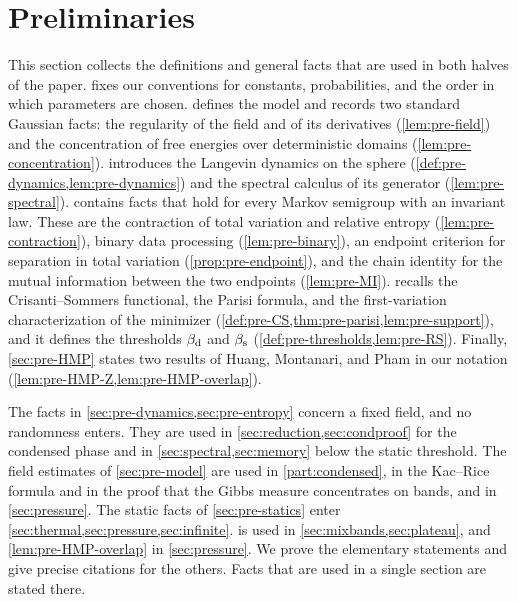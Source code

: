 \chapter{Preliminaries}\label{sec:prelim}

This section collects the definitions and general facts that are used in both halves of the paper.  fixes our conventions for constants, probabilities, and the order in which parameters are chosen.  defines the model and records two standard Gaussian facts: the regularity of the field and of its derivatives (\cref{lem:pre-field}) and the concentration of free energies over deterministic domains (\cref{lem:pre-concentration}).  introduces the Langevin dynamics on the sphere (\cref{def:pre-dynamics,lem:pre-dynamics}) and the spectral calculus of its generator (\cref{lem:pre-spectral}).  contains facts that hold for every Markov semigroup with an invariant law. These are the contraction of total variation and relative entropy (\cref{lem:pre-contraction}), binary data processing (\cref{lem:pre-binary}), an endpoint criterion for separation in total variation (\cref{prop:pre-endpoint}), and the chain identity for the mutual information between the two endpoints (\cref{lem:pre-MI}).  recalls the Crisanti--Sommers functional, the Parisi formula, and the first-variation characterization of the minimizer (\cref{def:pre-CS,thm:pre-parisi,lem:pre-support}), and it defines the thresholds $\beta_{\mathrm d}$ and $\beta_{\mathrm s}$ (\cref{def:pre-thresholds,lem:pre-RS}). Finally, \cref{sec:pre-HMP} states two results of Huang, Montanari, and Pham in our notation (\cref{lem:pre-HMP-Z,lem:pre-HMP-overlap}).

The facts in \cref{sec:pre-dynamics,sec:pre-entropy} concern a fixed field, and no randomness enters. They are used in \cref{sec:reduction,sec:condproof} for the condensed phase and in \cref{sec:spectral,sec:memory} below the static threshold. The field estimates of \cref{sec:pre-model} are used in \cref{part:condensed}, in the Kac--Rice formula and in the proof that the Gibbs measure concentrates on bands, and in \cref{sec:pressure}. The static facts of \cref{sec:pre-statics} enter \cref{sec:thermal,sec:pressure,sec:infinite}.  is used in \cref{sec:mixbands,sec:plateau}, and \cref{lem:pre-HMP-overlap} in \cref{sec:pressure}. We prove the elementary statements and give precise citations for the others. Facts that are used in a single section are stated there.

